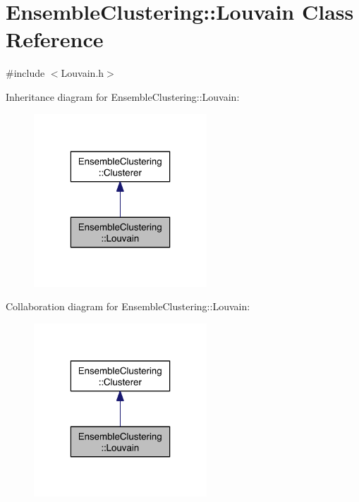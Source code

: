 \hypertarget{class_ensemble_clustering_1_1_louvain}{\section{Ensemble\-Clustering\-:\-:Louvain Class Reference}
\label{class_ensemble_clustering_1_1_louvain}
}


{\ttfamily \#include $<$Louvain.\-h$>$}



Inheritance diagram for Ensemble\-Clustering\-:\-:Louvain\-:
\nopagebreak
\begin{figure}[H]
\begin{center}
\leavevmode
\includegraphics[width=184pt]{class_ensemble_clustering_1_1_louvain__inherit__graph}
\end{center}
\end{figure}


Collaboration diagram for Ensemble\-Clustering\-:\-:Louvain\-:
\nopagebreak
\begin{figure}[H]
\begin{center}
\leavevmode
\includegraphics[width=184pt]{class_ensemble_clustering_1_1_louvain__coll__graph}
\end{center}
\end{figure}
